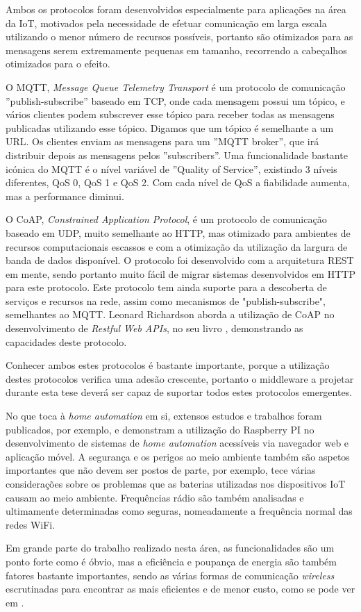 Ambos os protocolos foram desenvolvidos especialmente para aplicações na área da IoT, motivados pela necessidade de efetuar comunicação em larga escala utilizando o menor número de recursos possíveis, portanto são otimizados para as mensagens serem extremamente pequenas em tamanho, recorrendo a cabeçalhos otimizados para o efeito.

O MQTT, \textit{Message Queue Telemetry Transport} é um protocolo de comunicação ''publish-subscribe'' baseado em TCP, onde cada mensagem possui um tópico, e vários clientes podem subscrever esse tópico para receber todas as mensagens publicadas utilizando esse tópico. Digamos que um tópico é semelhante a um URL. Os clientes enviam as mensagens para um ''MQTT broker'', que irá distribuir depois as mensagens pelos ''subscribers''. Uma funcionalidade bastante icónica do MQTT é o nível variável de ''Quality of Service'', existindo 3 níveis diferentes, QoS 0, QoS 1 e QoS 2. Com cada nível de QoS a fiabilidade aumenta, mas a performance diminui.

O CoAP, \textit{Constrained Application Protocol}, é um protocolo de comunicação baseado em UDP, muito semelhante ao HTTP, mas otimizado para ambientes de recursos computacionais escassos e com a otimização da utilização da largura de banda de dados disponível. O protocolo foi desenvolvido com a arquitetura REST em mente, sendo portanto muito fácil de migrar sistemas desenvolvidos em HTTP para este protocolo. Este protocolo tem ainda suporte para a descoberta de serviços e recursos na rede, assim como mecanismos de "publish-subscribe", semelhantes ao MQTT. Leonard Richardson aborda a utilização de CoAP no desenvolvimento de \textit{Restful Web APIs}, no seu livro \cite{richardson2013restful}, demonstrando as capacidades deste protocolo.

Conhecer ambos estes protocolos é bastante importante, porque a utilização destes protocolos verifica uma adesão crescente, portanto o middleware a projetar durante esta tese deverá ser capaz de suportar todos estes protocolos emergentes.


No que toca à \textit{home automation} em si, extensos estudos e trabalhos foram publicados, por exemplo, \cite{iot-home-automation} e \cite{iot-home-automation-android} demonstram a utilização do Raspberry PI no desenvolvimento de sistemas de \textit{home automation} acessíveis via navegador web e aplicação móvel. A segurança e os perigos ao meio ambiente também são aspetos importantes que não devem ser postos de parte, por exemplo, \cite{iot-home-automation-android} tece várias considerações sobre os problemas que as baterias utilizadas nos dispositivos IoT causam ao meio ambiente. Frequências rádio são também analisadas e ultimamente determinadas como seguras, nomeadamente a frequência normal das redes WiFi.

Em grande parte do trabalho realizado nesta área, as funcionalidades são um ponto forte como é óbvio, mas a eficiência e poupança de energia são também fatores bastante importantes, sendo as várias formas de comunicação \textit{wireless} escrutinadas para encontrar as mais eficientes e de menor custo, como se pode ver em \cite{iot-home-automation-overview}.